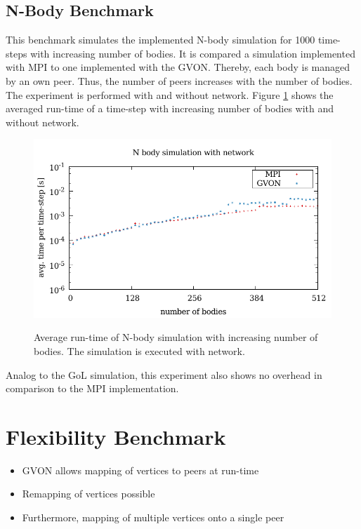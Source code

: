 \subsection{N-Body Benchmark}
This benchmark simulates the implemented N-body simulation for 1000
time-steps with increasing number of bodies. It is compared a
simulation implemented with MPI to one implemented with the GVON.
Thereby, each body is managed by an own peer. Thus, the number of
peers increases with the number of bodies. The experiment is performed
with and without network. Figure \ref{fig:nbody_laser} shows the
averaged run-time of a time-step with increasing number of bodies with
and without network.

\begin{figure}[H]
  \includegraphics[width=\textwidth]{plots/50_nbody_network_laser}
  \label{fig:nbody_laser}
  \caption{Average run-time of N-body simulation with increasing
    number of bodies. The simulation is executed with network.}
\end{figure}

Analog to the GoL simulation, this experiment also shows no overhead
in comparison to the MPI implementation.

\section{Flexibility Benchmark}
\begin{itemize}
\item GVON allows mapping of vertices to peers at run-time
\item Remapping of vertices possible
\item Furthermore, mapping of multiple vertices onto a single peer
\end{itemize}


